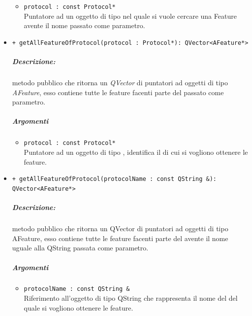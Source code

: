 \begin{itemize}
\begin{itemize}
				\item \color{RoyalPurple}\verb!protocol : const Protocol*! \\
				\color{black}Puntatore ad un oggetto di tipo \protocol{} nel quale si vuole cercare una Feature\g{} avente il nome passato come parametro.
			\end{itemize}
			
		\item \color{blue}\verb!+ getAllFeatureOfProtocol(protocol : Protocol*): QVector<AFeature*>!
		\color{black} 
		\subparagraph{Descrizione:} metodo pubblico che ritorna un \textsl{QVector} di puntatori ad oggetti di tipo \textsl{AFeature}, esso contiene tutte le feature\g{} facenti parte del \protocol{} passato come parametro.
		\subparagraph{Argomenti}
			\begin{itemize}
			\item \color{RoyalPurple}\verb!protocol : const Protocol*! \\
			\color{black}Puntatore ad un oggetto di tipo \protocol{}, identifica il \protocol{} di cui si vogliono ottenere le feature\g{}.
			\end{itemize}

		
		\item \color{blue}\verb!+ getAllFeatureOfProtocol(protocolName : const QString &): QVector<AFeature*>!
		\color{black} 
		\subparagraph{Descrizione:} metodo pubblico che ritorna un QVector di puntatori ad oggetti di tipo AFeature, esso contiene tutte le feature\g{} facenti parte del \protocol{} avente il nome uguale alla QString passata come parametro.
		\subparagraph{Argomenti}
		\begin{itemize}
			\item \verb!protocolName : const QString &! \\ 
			\color{black}Riferimento all'oggetto di tipo QString che rappresenta il nome del \protocol{} del quale si vogliono ottenere le feature\g{}.
		\end{itemize}
		
	\end{itemize}

\pagebreak
\color{black}

